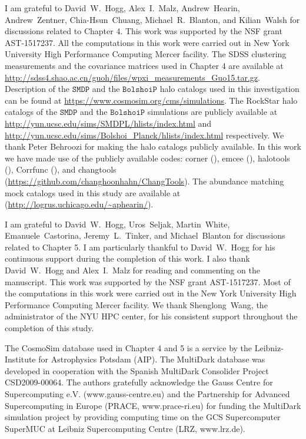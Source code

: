 I am grateful to David~W.~Hogg, Alex~I.~Malz, Andrew~Hearin, Andrew~Zentner, Chia-Hsun~Chuang, Michael~R.~Blanton, and Kilian~Walsh for discussions related to Chapter 4. This work was supported by the NSF grant AST-1517237. All the computations in this work were carried out in New York University High Performance Computing Mercer facility. 
The SDSS clustering measurements and the covariance matrices used in Chapter 4 are available at \url{http://sdss4.shao.ac.cn/guoh/files/wpxi_measurements_Guo15.tar.gz}. Description of the $\mathtt{SMDP}$ and the $\mathtt{BolshoiP}$ halo catalogs used in this investigation can be found at \url{https://www.cosmosim.org/cms/simulations}. The RockStar halo catalogs of the $\mathtt{SMDP}$ and the $\mathtt{BolshoiP}$ simulations are publicly available at \url{http://yun.ucsc.edu/sims/SMDPL/hlists/index.html} and \url{http://yun.ucsc.edu/sims/Bolshoi_Planck/hlists/index.html} respectively. We thank Peter Behroozi for making the halo catalogs publicly available. In this work we have made use of the publicly available codes: corner (\citealt{corner}), emcee (\citealt{emcee}), halotools (\citealt{halotools}), Corrfunc (\citealt{corrfunc}), and changtools (\url{https://github.com/changhoonhahn/ChangTools}). The abundance matching mock catalogs used in this study are available at (\url{http://logrus.uchicago.edu/~aphearin/}).  

I am grateful to David~W.~Hogg, Uros~Seljak, Martin~White, Emanuele~Castorina, Jeremy~L.~Tinker, and Michael~Blanton for discussions related to Chapter 5.
I am particularly thankful to David~W.~Hogg for his continuous support during the completion of this work. I also thank David~W.~Hogg and Alex~I.~Malz for reading and commenting on the manuscript. This work was supported by the NSF grant AST-1517237. Most of the computations in this work were carried out in the New York University High Performance Computing Mercer facility. We thank Shenglong~Wang, the administrator of the NYU HPC center, for his consistent support throughout the completion of this study.
 
The CosmoSim database used in Chapter 4 and 5 is a service by the Leibniz-Institute for Astrophysics Potsdam (AIP). The MultiDark database was developed in cooperation with the Spanish MultiDark Consolider Project CSD2009-00064. The authors gratefully acknowledge the Gauss Centre for Supercomputing e.V. (www.gauss-centre.eu) and the Partnership for Advanced Supercomputing in Europe (PRACE, www.prace-ri.eu) for funding the MultiDark simulation project by providing computing time on the GCS Supercomputer SuperMUC at Leibniz Supercomputing Centre (LRZ, www.lrz.de).

